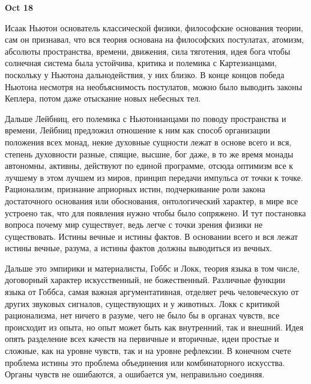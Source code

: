 \documentclass[a4paper, 12pt]{article}
\begin{document}
\hfill\textbf{Oct 18}

Исаак Ньютон основатель классической физики, философские основания 
теории, сам он признавал, что вся теория основана на философских 
постулатах, атомизм, абсолюты пространства, времени, движения, сила 
тяготения, идея бога чтобы солнечная система была устойчива, критика 
и полемика с Картезианцами, поскольку у Ньютона дальнодействия, у них 
близко. В конце концов победа Ньютона несмотря на необъяснимость 
постулатов, можно было выводить законы Кеплера, потом даже отыскание 
новых небесных тел.

Дальше Лейбниц, его полемика с Ньютонианцами по поводу пространства 
и времени, Лейбниц предложил отношение к ним как способ организации 
положения всех монад, некие духовные сущности лежат в основе всего 
и вся, степень духовности разные, спящие, высшие, бог даже, в то же 
время монады автономны, активны, действуют по единой программе, отсюда 
оптимизм все к лучшему в этом лучшем из миров, принцип передачи импульса 
от точки к точке. Рационализм, признание априорных истин, подчеркивание 
роли закона достаточного основания или обоснования, онтологический 
характер, в мире все устроено так, что для появления нужно чтобы было 
сопряжено. И тут постановка вопроса почему мир существует, ведь легче 
с точки зрения физики не существовать. Истины вечные и истины фактов. 
В основании всего и вся лежат истины вечные, разума, а истины фактов 
должны выводиться из вечных.

Дальше это эмпирики и материалисты, Гоббс и Локк, теория языка в том 
числе, договорный характер искусственный, не божественный. Различные 
функции языка от Гоббса, самая важная аргументативная, отделяет речь 
человеческую от других звуковых сигналов, существующих и у животных. 
Локк с критикой рационализма, нет ничего в разуме, чего не было бы 
в органах чувств, все происходит из опыта, но опыт может быть как 
внутренний, так и внешний. Идея опять разделение всех качеств на 
первичные и вторичные, идеи простые и сложные, как на уровне чувств, так 
и на уровне рефлексии. В конечном счете проблема истины это проблема 
объединения или комбинаторного искусства. Органы чувств не ошибаются, 
а ошибается ум, неправильно соединяя.
\end{document}
